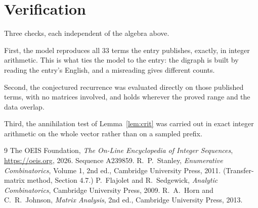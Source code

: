 \documentclass[11pt,a4paper]{article}
\theoremstyle{plain}
\theoremstyle{definition}
\begin{document}
\section{Verification}

Three checks, each independent of the algebra above.

First, the model reproduces all $33$ terms the entry publishes, exactly, in integer
arithmetic. This is what ties the model to the entry: the digraph is built by reading the
entry's English, and a misreading gives different counts.

Second, the conjectured recurrence was evaluated directly on those published terms, with no
matrices involved, and holds wherever the proved range and the data overlap.

Third, the annihilation test of Lemma~\ref{lem:crit} was carried out in exact integer
arithmetic on the whole vector rather than on a sampled prefix.

\begin{thebibliography}{9}
 The OEIS Foundation, \emph{The On-Line Encyclopedia of Integer
Sequences}, \url{https://oeis.org}, 2026. Sequence A239859.
 R.~P.~Stanley, \emph{Enumerative Combinatorics}, Volume 1, 2nd ed.,
Cambridge University Press, 2011. (Transfer-matrix method, Section 4.7.)
 P.~Flajolet and R.~Sedgewick, \emph{Analytic Combinatorics}, Cambridge
University Press, 2009.
 R.~A.~Horn and C.~R.~Johnson, \emph{Matrix Analysis}, 2nd ed., Cambridge
University Press, 2013.
\end{thebibliography}
\end{document}
